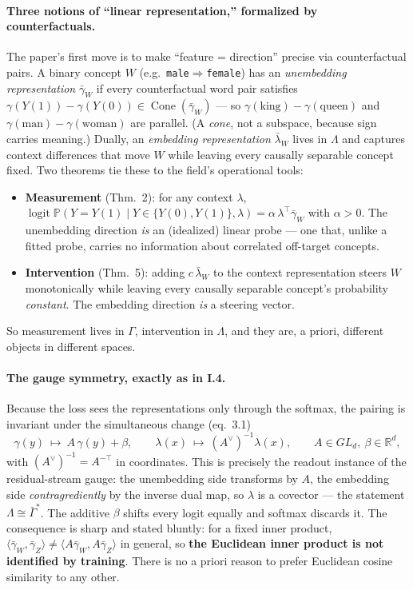 \paragraph*{Three notions of ``linear representation,'' formalized by counterfactuals.}
The paper's first move is to make ``feature = direction'' precise via counterfactual pairs. A binary concept $W$ (e.g.\ \texttt{male}$\Rightarrow$\texttt{female}) has an \emph{unembedding representation} $\bar\gamma_{W}$ if every counterfactual word pair satisfies $\gamma(Y(1))-\gamma(Y(0))\in\operatorname{Cone}(\bar\gamma_W)$ --- so $\gamma(\text{king})-\gamma(\text{queen})$ and $\gamma(\text{man})-\gamma(\text{woman})$ are parallel. (A \emph{cone}, not a subspace, because sign carries meaning.) Dually, an \emph{embedding representation} $\bar\lambda_{W}$ lives in $\Lambda$ and captures context differences that move $W$ while leaving every causally separable concept fixed. Two theorems tie these to the field's operational tools:
\begin{itemize}[leftmargin=1.4em]
\item \textbf{Measurement} (Thm.~2): for any context $\lambda$, $\operatorname{logit}\mathbb{P}(Y=Y(1)\mid Y\in\{Y(0),Y(1)\},\lambda)=\alpha\,\lambda^{\top}\bar\gamma_{W}$ with $\alpha>0$. The unembedding direction \emph{is} an (idealized) linear probe --- one that, unlike a fitted probe, carries no information about correlated off-target concepts.
\item \textbf{Intervention} (Thm.~5): adding $c\,\bar\lambda_{W}$ to the context representation steers $W$ monotonically while leaving every causally separable concept's probability \emph{constant}. The embedding direction \emph{is} a steering vector.
\end{itemize}
So measurement lives in $\Gamma$, intervention in $\Lambda$, and they are, a priori, different objects in different spaces.

\paragraph*{The gauge symmetry, exactly as in I.4.}
Because the loss sees the representations only through the softmax, the pairing is invariant under the simultaneous change (eq.~3.1)
\[
\gamma(y)\ \mapsto\ A\,\gamma(y)+\beta,
\qquad
\lambda(x)\ \mapsto\ (A^{\vee})^{-1}\lambda(x),
\qquad A\in GL_d,\ \beta\in\mathbb{R}^{d},
\]
with $(A^{\vee})^{-1}=A^{-\top}$ in coordinates. This is precisely the readout instance of the residual-stream gauge: the unembedding side transforms by $A$, the embedding side \emph{contragrediently} by the inverse dual map, so $\lambda$ is a covector --- the statement $\Lambda\cong\bar\Gamma^{*}$. The additive $\beta$ shifts every logit equally and softmax discards it. The consequence is sharp and stated bluntly: for a fixed inner product, $\langle\bar\gamma_W,\bar\gamma_Z\rangle\neq\langle A\bar\gamma_W,A\bar\gamma_Z\rangle$ in general, so \textbf{the Euclidean inner product is not identified by training}. There is no a priori reason to prefer Euclidean cosine similarity to any other.

